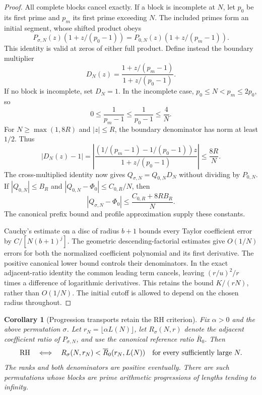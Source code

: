 \documentclass[11pt]{article}
\newtheorem{corollary}[theorem]{Corollary}
\theoremstyle{definition}
\begin{document}
\begin{proof}
All complete blocks cancel exactly. If a block is incomplete at $N$, let
$p_0$ be its first prime and $p_m$ its first prime exceeding $N$.
The included primes form an initial segment, whose shifted product obeys
\[
 P_{\sigma,N}(z)(1+z/(p_0-1))
   =P_{0,N}(z)(1+z/(p_m-1)).
\]
This identity is valid at zeros of either full product. Define instead the
boundary multiplier
\[
 D_N(z)=\frac{1+z/(p_m-1)}{1+z/(p_0-1)}.
\]
If no block is incomplete, set $D_N=1$. In the incomplete case,
$p_0\le N<p_m\le2p_0$, so
\[
 0\le\frac1{p_m-1}\le\frac1{p_0-1}\le\frac4N.
\]
For $N\ge\max(1,8R)$ and $|z|\le R$, the boundary denominator has norm
at least $1/2$. Thus
\[
 |D_N(z)-1|
 =\left|\frac{(1/(p_m-1)-1/(p_0-1))z}{1+z/(p_0-1)}\right|
 \le\frac{8R}{N}.
\]
The cross-multiplied identity now gives
$Q_{\sigma,N}=Q_{0,N}D_N$ without dividing by $P_{0,N}$.
If $|Q_{0,N}|\le B_R$ and
$|Q_{0,N}-\Phi_0|\le C_{0,R}/N$, then
\[
 |Q_{\sigma,N}-\Phi_0|
 \le\frac{C_{0,R}+8RB_R}{N}.
\]
The canonical prefix bound and profile approximation supply these constants.

Cauchy's estimate on a disc of radius $b+1$ bounds every Taylor coefficient
error by $C/[N(b+1)^j]$. The geometric descending-factorial estimates give
$O(1/N)$ errors for both the normalized coefficient polynomial and its first
derivative. The positive canonical lower bound controls their denominators.
In the exact adjacent-ratio identity the common leading term cancels,
leaving $(r/u)^2/r$ times a difference of logarithmic derivatives.
This retains the bound $K/(rN)$, rather than $O(1/N)$.
The initial cutoff is allowed to depend on the chosen radius throughout.
\end{proof}

\begin{corollary}[Progression transports retain the RH criterion]
\label{cor:prime-progression-transport-rh}
Fix $\alpha>0$ and the above permutation $\sigma$. Let
$r_N=\lfloor\alpha L(N)\rfloor$, let $R_\sigma(N,r)$ denote the adjacent
coefficient ratio of $P_{\sigma,N}$, and use the canonical reference ratio
$\overline R_0$. Then
\[
 \mathrm{RH}\quad\Longleftrightarrow\quad
 R_\sigma(N,r_N)<\overline R_0(r_N,L(N))
 \quad\hbox{for every sufficiently large }N.
\]
The ranks and both denominators are positive eventually.
There are such permutations whose blocks are prime arithmetic progressions
of lengths tending to infinity.
\end{corollary}
\end{document}

